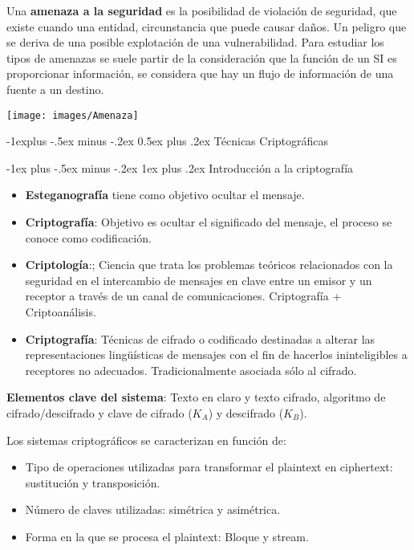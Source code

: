 \documentclass[10pt,portrait, twocolumn]{article}
\makeatletter
\renewcommand{\subsection}{\@startsection{subsection}{2}{0mm}%
                                {-1explus -.5ex minus -.2ex}%
                                {0.5ex plus .2ex}%
                                {\normalfont\normalsize\bfseries}}
\renewcommand{\subsubsection}{\@startsection{subsubsection}{3}{0mm}%
                                {-1ex plus -.5ex minus -.2ex}%
                                {1ex plus .2ex}%
                                {\normalfont\small\bfseries}}
\makeatother
\begin{document}
Una \textbf{amenaza a la seguridad} es la posibilidad de violación de seguridad, que existe cuando una entidad, circunstancia que puede causar daños. Un peligro que se deriva de una posible explotación de una vulnerabilidad. Para estudiar los tipos de amenazas se suele partir de la consideración que la función de un SI es proporcionar información, se considera que hay un flujo de información de una fuente a un destino.

\begin{center}
	\texttt{[image: images/Amenaza]}
\end{center}


\subsection{Técnicas Criptográficas}

	\subsubsection{Introducción a la criptografía}
	
	\begin{itemize}
		\item \textbf{Esteganografía} tiene como objetivo ocultar el mensaje.
		\item \textbf{Criptografía}: Objetivo es ocultar el significado del mensaje, el proceso se conoce como codificación.
		\item \textbf{Criptología}:; Ciencia que trata los problemas teóricos relacionados con la seguridad en el intercambio de mensajes en clave entre un emisor y un receptor a través de un canal de comunicaciones. Criptografía + Criptoanálisis.
		\item \textbf{Criptografía}: Técnicas de cifrado o codificado destinadas a alterar las representaciones lingüísticas de mensajes con el fin de hacerlos ininteligibles a receptores no adecuados. Tradicionalmente asociada sólo al cifrado.
	\end{itemize}
	
	\textbf{Elementos clave del sistema}: Texto en claro y texto cifrado, algoritmo de cifrado/descifrado y clave de cifrado ($K_A$) y descifrado ($K_B$).
	
	Los sistemas criptográficos se caracterizan en función de:
	
	\begin{itemize}
		\item Tipo de operaciones utilizadas para transformar el plaintext en ciphertext: sustitución y transposición.
		\item Número de claves utilizadas: simétrica y asimétrica.
		\item Forma en la que se procesa el plaintext: Bloque y stream.
	\end{itemize}
	
\end{document}
